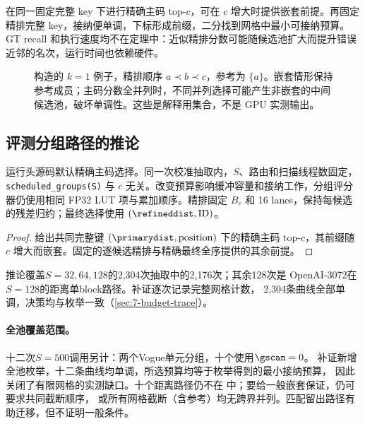 在同一固定完整 key 下进行精确主码 top-$c$，可在 $c$ 增大时提供嵌套前提。再固定精排完整 key，接纳便单调，下标形成前缀，二分找到网格中最小可接纳预算。GT recall 和执行速度均不在定理中：近似精排分数可能随候选池扩大而提升错误近邻的名次，运行时间也依赖硬件。

\begin{figure}[tbp]
\centering

\caption[嵌套与非嵌套候选池]{构造的 $k=1$ 例子，精排顺序 $a\prec b\prec c$，参考为 $\{a\}$。嵌套情形保持参考成员；主码分数全并列时，不同并列选择可能产生非嵌套的中间候选池，破坏单调性。这些是解释用集合，不是 GPU 实测输出。}
\label{fig:6-nesting}
\end{figure}

\subsection{评测分组路径的推论}

运行头源码默认精确主码选择。同一次校准抽取内，$S$、路由和扫描线程数固定，\texttt{scheduled\_groups(S)} 与 $c$ 无关。改变预算影响缓冲容量和接纳工作，分组评分器仍使用相同 FP32 LUT 项与累加顺序。精排固定 $B_r$ 和 16 lanes，保持每候选的残差归约；最终选择使用 $(\refineddist,\mathrm{ID})$。

\par\noindent\begin{minipage}{\linewidth}
\begin{proof}
给出共同完整键 $(\primarydist,\mathrm{position})$ 下的精确主码 top-$c$，其前缀随 $c$ 增大而嵌套。固定的逐候选精排与精确最终全序提供的其余前提。
\end{proof}
\end{minipage}\par\medskip

推论覆盖$S=32,64,128$的2,304次抽取中的2,176次；其余128次是
OpenAI-3072在$S=128$的距离单block路径。补证逐次记录完整网格计数，
2,304条曲线全部单调，决策均与枚举一致（\cref{sec:7-budget-trace}）。

\paragraph{全池覆盖范围。}
十二次$S=500$调用另计：两个Vogue单元分组，十个使用$\gscan=0$。
补证新增全池枚举，十二条曲线均单调，所选预算均等于枚举得到的最小接纳预算，
因此关闭了有限网格的实测缺口。十个距离路径仍不在
中；要给一般嵌套保证，仍可要求共同截断顺序，
或所有网格截断（含参考）均无跨界并列。匹配留出路径有助迁移，但不证明一般条件。

